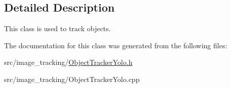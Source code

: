\subsection{Detailed Description}
This class is used to track objects. 

The documentation for this class was generated from the following files\+:\begin{DoxyCompactItemize}
\item 
src/image\+\_\+tracking/\mbox{\hyperlink{_object_tracker_yolo_8h}{Object\+Tracker\+Yolo.\+h}}\item 
src/image\+\_\+tracking/Object\+Tracker\+Yolo.\+cpp\end{DoxyCompactItemize}
